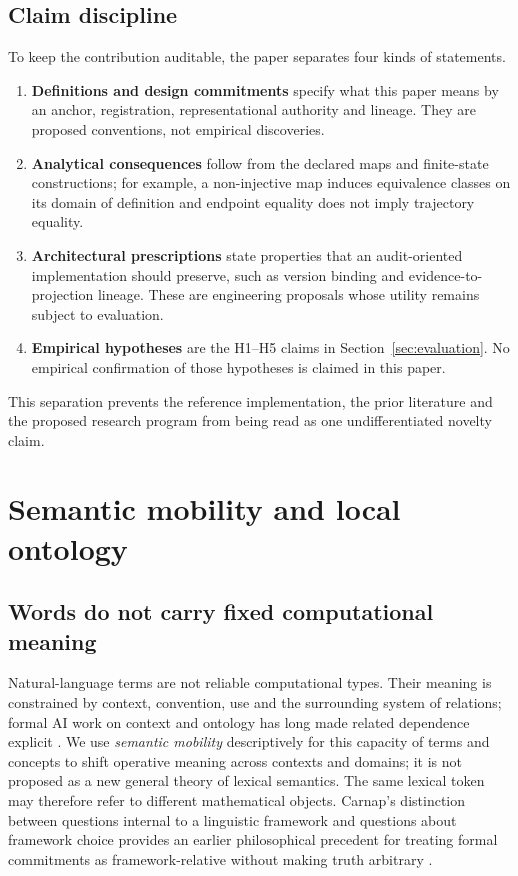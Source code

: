 \documentclass[11pt,a4paper]{article}
\begin{document}
\subsection{Claim discipline}
To keep the contribution auditable, the paper separates four kinds of statements.
\begin{enumerate}
    \item \textbf{Definitions and design commitments} specify what this paper means by an anchor, registration, representational authority and lineage. They are proposed conventions, not empirical discoveries.
    \item \textbf{Analytical consequences} follow from the declared maps and finite-state constructions; for example, a non-injective map induces equivalence classes on its domain of definition and endpoint equality does not imply trajectory equality.
    \item \textbf{Architectural prescriptions} state properties that an audit-oriented implementation should preserve, such as version binding and evidence-to-projection lineage. These are engineering proposals whose utility remains subject to evaluation.
    \item \textbf{Empirical hypotheses} are the H1--H5 claims in Section~\ref{sec:evaluation}. No empirical confirmation of those hypotheses is claimed in this paper.
\end{enumerate}
This separation prevents the reference implementation, the prior literature and the proposed research program from being read as one undifferentiated novelty claim.

\section{Semantic mobility and local ontology}
\subsection{Words do not carry fixed computational meaning}
Natural-language terms are not reliable computational types. Their meaning is constrained by context, convention, use and the surrounding system of relations; formal AI work on context and ontology has long made related dependence explicit \cite{mccarthy1993,gruber1993,guarino1998}. We use \emph{semantic mobility} descriptively for this capacity of terms and concepts to shift operative meaning across contexts and domains; it is not proposed as a new general theory of lexical semantics. The same lexical token may therefore refer to different mathematical objects. Carnap's distinction between questions internal to a linguistic framework and questions about framework choice provides an earlier philosophical precedent for treating formal commitments as framework-relative without making truth arbitrary \cite{carnap1950}.
\end{document}
